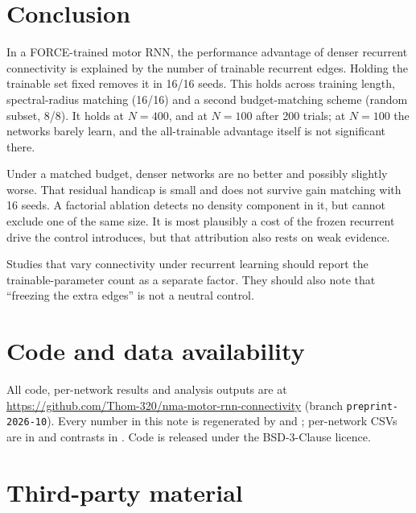 \documentclass[11pt]{article}
\begin{document}
\section{Conclusion}

In a FORCE-trained motor RNN, the performance advantage of denser recurrent
connectivity is explained by the number of trainable recurrent edges.
Holding the trainable set fixed removes it in 16/16 seeds. This holds across
training length, spectral-radius matching (16/16) and a second
budget-matching scheme (random subset, 8/8). It holds at $N=400$, and at
$N=100$ after 200 trials; at $N=100$ the networks barely learn, and the
all-trainable advantage itself is not significant there.

Under a matched budget, denser networks are no better and possibly slightly
worse. That residual handicap is small and does not survive gain matching
with 16 seeds. A factorial ablation detects no density component in it, but
cannot exclude one of the same size. It is most plausibly a cost of the
frozen recurrent drive the control introduces, but that attribution also
rests on weak evidence.

Studies that vary connectivity under recurrent learning should report the
trainable-parameter count as a separate factor. They should also note that
``freezing the extra edges'' is not a neutral control.

\section*{Code and data availability}
\sloppy

All code, per-network results and analysis outputs are at
\url{https://github.com/Thom-320/nma-motor-rnn-connectivity}
(branch \texttt{preprint-2026-10}). Every number in this note is regenerated
by  and
; per-network CSVs are in
 and contrasts in
. Code is released under the
BSD-3-Clause licence.

\section*{Third-party material}
\end{document}
